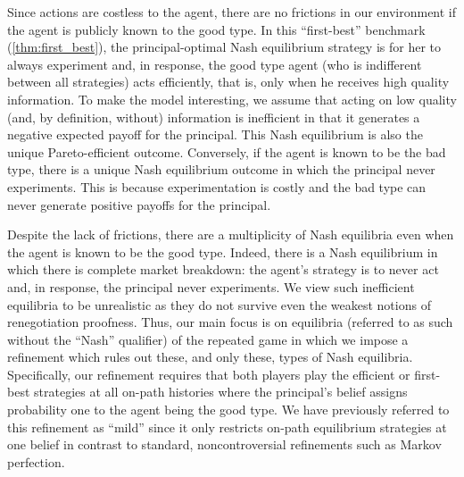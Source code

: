 \documentclass[11pt,reqno]{amsart}
\begin{document}
Since actions are costless to the agent, there are no frictions in our environment if the agent is publicly known to the good type. In this ``first-best'' benchmark (\cref{thm:first_best}), the principal-optimal Nash equilibrium strategy is for her to always experiment and, in response, the good type agent (who is indifferent between all strategies) acts efficiently, that is, only when he receives high quality information. To make the model interesting, we assume that acting on low quality (and, by definition, without) information is inefficient in that it generates a negative expected payoff for the principal. This Nash equilibrium is also the unique Pareto-efficient outcome. Conversely, if the agent is known to be the bad type, there is a unique Nash equilibrium outcome in which the principal never experiments. This is because experimentation is costly and the bad type can never generate positive payoffs for the principal.

Despite the lack of frictions, there are a multiplicity of Nash equilibria even when the agent is known to be the good type. Indeed, there is a Nash equilibrium in which there is complete market breakdown: the agent's strategy is to never act and, in response, the principal never experiments. We view such inefficient equilibria to be unrealistic as they do not survive even the weakest notions of renegotiation proofness. Thus, our main focus is on equilibria (referred to as such without the ``Nash'' qualifier) of the repeated game in which we impose a refinement which rules out these, and only these, types of Nash equilibria. Specifically, our refinement requires that both players play the efficient or first-best strategies at all on-path histories where the principal's belief assigns probability one to the agent being the good type. We have previously referred to this refinement as ``mild'' since it only restricts on-path equilibrium strategies at one belief in contrast to standard, noncontroversial refinements such as Markov perfection.
\end{document}

